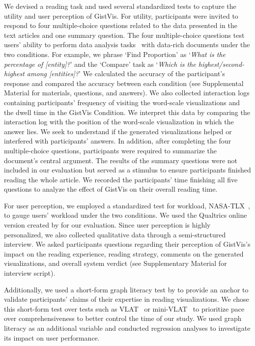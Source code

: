 We devised a reading task and used several standardized tests to capture the utility and user perception of GistVis. For utility, participants were invited to respond to four multiple-choice questions related to the data presented in the text articles and one summary question. The four multiple-choice questions test users' ability to perform data analysis tasks~\cite{amar2005lowlevel} with data-rich documents under the two conditions.
For example, we phrase `Find Proportion' as `\textit{What is the percentage of [entity]?}' and the `Compare' task as `\textit{Which is the highest/second-highest among [entities]?}' We calculated the accuracy of the participant's response and compared the accuracy between each condition (see Supplemental Material for materials, questions, and answers). We also collected interaction logs containing participants' frequency of visiting the word-scale visualizations and the dwell time in the GistVis Condition. We interpret this data by comparing the interaction log with the position of the word-scale visualization in which the answer lies. We seek to understand if the generated visualizations helped or interfered with participants' answers. In addition, after completing the four multiple-choice questions, participants were required to summarize the document's central argument. The results of the summary questions were not included in our evaluation but served as a stimulus to ensure participants finished reading the whole article. We recorded the participants' time finishing all five questions to analyze the effect of GistVis on their overall reading time.

For user perception, we employed a standardized test for workload, NASA-TLX~\cite{hart1988development}, to gauge users' workload under the two conditions. We used the Qualtrics online version created by \citet{castro2022examining} for our evaluation. Since user perception is highly personalized, we also collected qualitative data through a semi-structured interview. We asked participants questions regarding their perception of GistVis's impact on the reading experience, reading strategy, comments on the generated visualizations, and overall system verdict (see Supplementary Material for interview script).

Additionally, we used a short-form graph literacy test by \citet{okan2019using} to provide an anchor to validate participants' claims of their expertise in reading visualizations. We chose this short-form test over tests such as VLAT~\cite{lee2017vlat} or mini-VLAT~\cite{pandey2023minivlat} to prioritize pace over comprehensiveness to better control the time of our study. We used graph literacy as an additional variable and conducted regression analyses to investigate its impact on user performance. 


